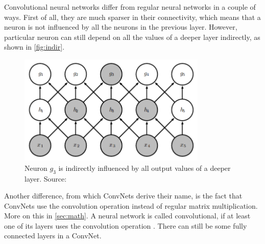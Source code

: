 Convolutional neural networks differ from regular neural networks in a couple of ways. First of all, they are much sparser in their connectivity, which means that a neuron is not influenced by all the neurons in the previous layer. However, particular neuron can still depend on all the values of a deeper layer indirectly, as shown in \autoref{fig:indir}.\\

\begin{figure}
    \centering
    \includegraphics[width=0.8\textwidth]{images/indir.png}
    \caption{Neuron $g_3$ is indirectly influenced by all output values of a deeper layer. Source: \cite{dl-book}}
    \label{fig:indir}
\end{figure}

Another difference, from which ConvNets derive their name, is the fact that ConvNets use the convolution operation instead of regular matrix multiplication. More on this in \autoref{sec:math}. A neural network is called convolutional, if at least one of its layers uses the convolution operation \cite[Ch. 9]{dl-book}. There can still be some fully connected layers in a ConvNet.\\









